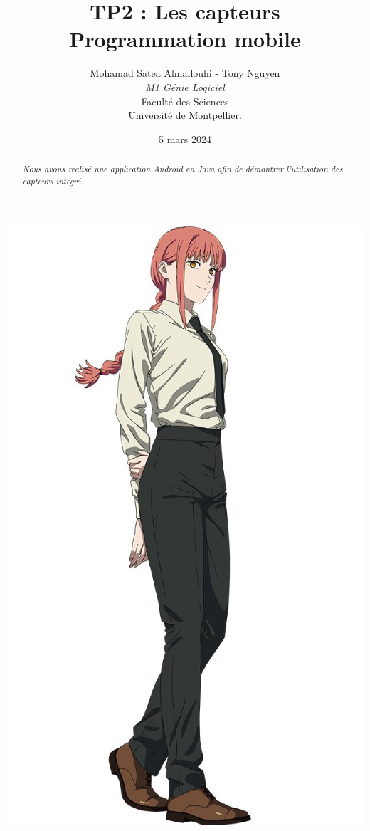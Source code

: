 \documentclass[a4paper]{article}
\title{  TP2 : Les capteurs\\Programmation mobile}
\author{Mohamad Satea Almallouhi - Tony Nguyen\\\emph{M1 Génie Logiciel}\\Faculté des Sciences\\Université de Montpellier.}
\date{5 mars 2024}
\begin{document}
    \maketitle
    \begin{center}
    \includegraphics[height=.95\textwidth]{makima_standing}
    \end{center}

    \begin{abstract}     %
      \emph{Nous avons réalisé une application Android en Java afin de démontrer l'utilisation des capteurs intégré.}
    \end{abstract}
    \newpage
    \tableofcontents
\end{document}
